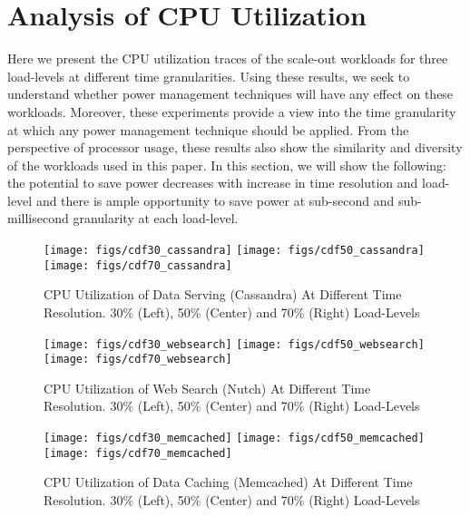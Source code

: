 \documentclass{sig-alternate}
\begin{document}
 \section{Analysis of CPU Utilization}
\label{sec:util}

Here we present the CPU utilization traces of the scale-out 
workloads for three load-levels at different time granularities. 
Using these results, we seek to understand whether power management 
techniques will have any effect on these workloads. Moreover, these 
experiments provide a view into the time granularity at which any power 
management technique should be applied. From the perspective of processor 
usage, these results also show the similarity and diversity of the workloads 
used in this paper. In this section, we will show the following: the potential 
to save power decreases with increase in time resolution and load-level and 
there is ample opportunity to save power at sub-second and sub-millisecond 
granularity at each load-level. 

\begin{figure*}[t]
\begin{minipage}[b]{1.0\linewidth}
\centering
\texttt{[image: figs/cdf30\_cassandra]}
\texttt{[image: figs/cdf50\_cassandra]}
\texttt{[image: figs/cdf70\_cassandra]}
\caption{CPU Utilization of Data Serving (Cassandra) At Different Time Resolution. 
30\% (Left), 50\% (Center) and 70\% (Right) Load-Levels}
\label{fig:utilac}
\end{minipage}

\begin{minipage}[b]{1.0\linewidth}
\centering
\texttt{[image: figs/cdf30\_websearch]}
\texttt{[image: figs/cdf50\_websearch]}
\texttt{[image: figs/cdf70\_websearch]}
\caption{CPU Utilization of Web Search (Nutch) At Different Time Resolution. 
30\% (Left), 50\% (Center) and 70\% (Right) Load-Levels}
\label{fig:utilws}
\end{minipage}

\begin{minipage}[b]{1.0\linewidth}
\centering
\texttt{[image: figs/cdf30\_memcached]}
\texttt{[image: figs/cdf50\_memcached]}
\texttt{[image: figs/cdf70\_memcached]}
\caption{CPU Utilization of Data Caching (Memcached) At Different Time Resolution. 
30\% (Left), 50\% (Center) and 70\% (Right) Load-Levels}
\label{fig:utilmc}
\end{minipage}
\end{figure*}
\end{document}
